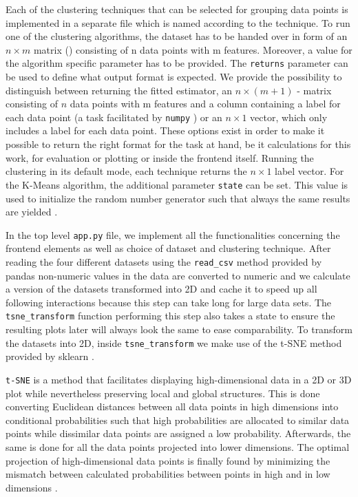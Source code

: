 Each of the clustering techniques that can be selected for grouping data points is implemented in a separate file which is named according to the technique. To run one of the clustering algorithms, the dataset has to be handed over in form of an $n \times m$ matrix () consisting of n data points with m features. Moreover, a value for the algorithm specific parameter has to be provided. The \texttt{returns} parameter can be used to define what output format is expected. We provide the possibility to distinguish between returning the fitted estimator, an $n \times (m+1)$ - matrix consisting of $n$ data points with m features and a column containing a label for each data point (a task facilitated by \texttt{numpy} \cite{harris2020array}) or an $n \times 1$ vector, which only includes a label for each data point. These options exist in order to make it possible to return the right format for the task at hand, be it calculations for this work, for evaluation or plotting or inside the frontend itself. Running the clustering in its default mode, each technique returns the $n \times 1$ label vector.
For the K-Means algorithm, the additional parameter \texttt{state} can be set. This value is used to initialize the random number generator such that always the same results are yielded \cite{sklearn_api}.

In the top level \texttt{app.py} file, we implement all the functionalities concerning the frontend elements as well as choice of dataset and clustering technique. After reading the four different datasets using the \texttt{read_csv} method provided by pandas \cite{reback2020pandas, mckinney-proc-scipy-2010} non-numeric values in the data are converted to numeric and we calculate a version of the datasets transformed into 2D and cache it to speed up all following interactions because this step can take long for large data sets. The \texttt{tsne_transform} function performing this step also takes a state to ensure the resulting plots later will always look the same to ease comparability. To transform the datasets into 2D, inside \texttt{tsne_transform} we make use of the \gls{t-SNE} method provided by \gls{sklearn} \cite{sklearn_api}.

\texttt{t-SNE} is a method that facilitates displaying high-dimensional data in a 2D or 3D plot while nevertheless preserving local and global structures. This is done converting Euclidean distances between all data points in high dimensions into conditional probabilities such that high probabilities are allocated to similar data points while dissimilar data points are assigned a low probability. Afterwards, the same is done for all the data points projected into lower dimensions. The optimal projection of high-dimensional data points is finally found by minimizing the mismatch between calculated probabilities between points in high and in low dimensions \cite{van2008visualizing}.

